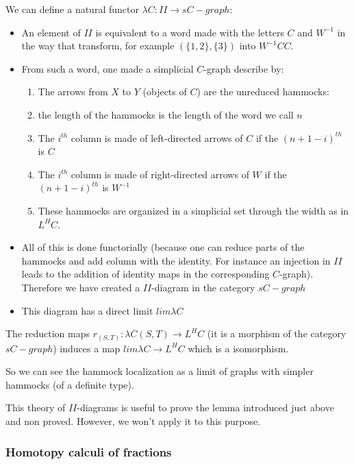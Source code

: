 We can define a natural functor $\lambda C : II \rightarrow sC-graph$:
\begin{itemize}
\item An element of $II$ is equivalent to a word made with the letters $C$ and $W^{-1}$ in the way that transform, for example $(\{1,2\},\{3\})$ into $W^{-1} C C$.
\item From such a word, one made a simplicial $C$-graph describe by:
\begin{enumerate}
\item The arrows from $X$ to $Y$ (objects of $C$) are the unreduced hammocks:
\item the length of the hammocks is the length of the word we call $n$
\item The $i^{th}$ column is made of left-directed arrows of $C$ if the $(n+1-i)^{th}$ is $C$
\item The $i^{th}$ column is made of right-directed arrows of $W$ if the $(n+1-i)^{th}$ is $W^{-1}$  
\item These hammocks are organized in a simplicial set through the width as in $L^H C$.
\end{enumerate}
\item All of this is done functorially (because one can reduce parts of the hammocks and add column with the identity. For instance an injection in $II$ leads to the addition of identity maps in the corresponding $C$-graph). Therefore we have created a $II$-diagram in the category $sC-graph$
\item This diagram has a direct limit $lim \lambda C$
\end{itemize}


\begin{prop}
The reduction maps $r_{(S,T)} : \lambda C (S,T) \rightarrow L^H C$ (it is a morphism of the category $sC-graph$) induces a map $lim \lambda C \rightarrow L^H C$ which is a isomorphism.
\end{prop}

So we can see the hammock localization as a limit of graphs with simpler hammocks (of a definite type).

\begin{rmk}
This theory of $II$-diagrams is useful to prove the lemma introduced just above and non proved. However, we won't apply it to this purpose.
\end{rmk}

\subsubsection{Homotopy calculi of fractions}

